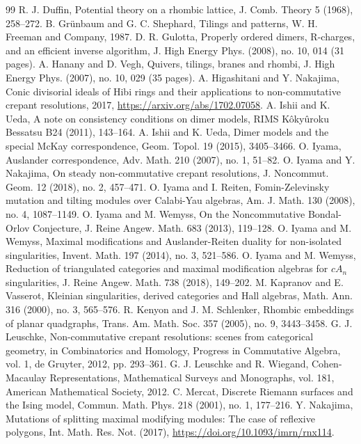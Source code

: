 \documentclass[11pt]{amsart}
\theoremstyle{definition}
\begin{document}
\begin{thebibliography}{99}
 R. J. Duffin, Potential theory on a rhombic lattice, J. Comb. Theory 5 (1968), 258--272.
 B. Grünbaum and G. C. Shephard, Tilings and patterns, W. H. Freeman and Company, 1987.
 D. R. Gulotta, Properly ordered dimers, R-charges, and an efficient inverse algorithm, J. High Energy Phys. (2008), no. 10, 014 (31 pages).
 A. Hanany and D. Vegh, Quivers, tilings, branes and rhombi, J. High Energy Phys. (2007), no. 10, 029 (35 pages).
 A. Higashitani and Y. Nakajima, Conic divisorial ideals of Hibi rings and their applications to non-commutative crepant resolutions, 2017, \url{https://arxiv.org/abs/1702.07058}.
 A. Ishii and K. Ueda, A note on consistency conditions on dimer models, RIMS Kôkyûroku Bessatsu B24 (2011), 143--164.
 A. Ishii and K. Ueda, Dimer models and the special McKay correspondence, Geom. Topol. 19 (2015), 3405--3466.
 O. Iyama, Auslander correspondence, Adv. Math. 210 (2007), no. 1, 51--82.
 O. Iyama and Y. Nakajima, On steady non-commutative crepant resolutions, J. Noncommut. Geom. 12 (2018), no. 2, 457--471.
 O. Iyama and I. Reiten, Fomin-Zelevinsky mutation and tilting modules over Calabi-Yau algebras, Am. J. Math. 130 (2008), no. 4, 1087--1149.
 O. Iyama and M. Wemyss, On the Noncommutative Bondal-Orlov Conjecture, J. Reine Angew. Math. 683 (2013), 119--128.
 O. Iyama and M. Wemyss, Maximal modifications and Auslander-Reiten duality for non-isolated singularities, Invent. Math. 197 (2014), no. 3, 521--586.
 O. Iyama and M. Wemyss, Reduction of triangulated categories and maximal modification algebras for $cA_n$ singularities, J. Reine Angew. Math. 738 (2018), 149--202.
 M. Kapranov and E. Vasserot, Kleinian singularities, derived categories and Hall algebras, Math. Ann. 316 (2000), no. 3, 565--576.
 R. Kenyon and J. M. Schlenker, Rhombic embeddings of planar quadgraphs, Trans. Am. Math. Soc. 357 (2005), no. 9, 3443--3458.
 G. J. Leuschke, Non-commutative crepant resolutions: scenes from categorical geometry, in Combinatorics and Homology, Progress in Commutative Algebra, vol. 1, de Gruyter, 2012, pp. 293--361.
 G. J. Leuschke and R. Wiegand, Cohen-Macaulay Representations, Mathematical Surveys and Monographs, vol. 181, American Mathematical Society, 2012.
 C. Mercat, Discrete Riemann surfaces and the Ising model, Commun. Math. Phys. 218 (2001), no. 1, 177--216.
 Y. Nakajima, Mutations of splitting maximal modifying modules: The case of reflexive polygons, Int. Math. Res. Not. (2017), \url{https://doi.org/10.1093/imrn/rnx114}.

\end{thebibliography}
\end{document}
